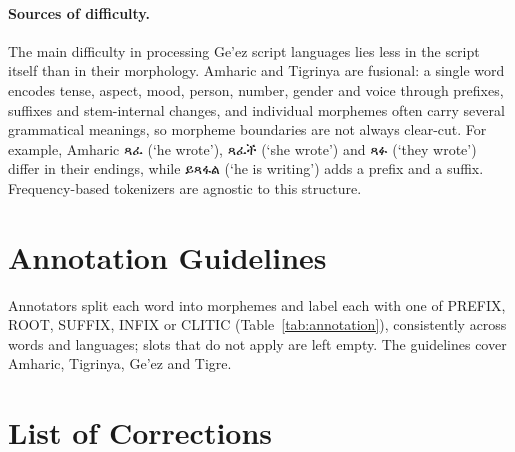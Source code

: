 \documentclass[11pt]{article}
\newcommand{\eth}[1]{{\ethiopicfont #1}}
\begin{document}
\paragraph{Sources of difficulty.} The main difficulty in processing Ge'ez
script languages lies less in the script itself than in their morphology.
Amharic and Tigrinya are fusional: a single word encodes tense, aspect, mood,
person, number, gender and voice through prefixes, suffixes and stem-internal
changes, and individual morphemes often carry several grammatical meanings, so
morpheme boundaries are not always clear-cut. For example, Amharic \eth{ጻፈ} (`he
wrote'), \eth{ጻፈች} (`she wrote') and \eth{ጻፉ} (`they wrote') differ in their endings,
while \eth{ይጻፋል} (`he is writing') adds a prefix and a suffix. Frequency-based
tokenizers are agnostic to this structure.

\begin{table}[t]
  \centering
  \small
  
  \caption{Annotation records from the released data. Amharic shows the
  published example; the published Tigrinya, Ge'ez and Tigre examples are not
  in the released files for those languages, so the first multi-morpheme
  record of each file is shown. ``--'': empty slot.}
  \label{tab:annotation}
\end{table}

\section{Annotation Guidelines}

Annotators split each word into morphemes and label each with one of PREFIX,
ROOT, SUFFIX, INFIX or CLITIC (Table~\ref{tab:annotation}), consistently across
words and languages; slots that do not apply are left empty. The guidelines
cover Amharic, Tigrinya, Ge'ez and Tigre.

\section{List of Corrections}
\label{app:corrections}
\end{document}
